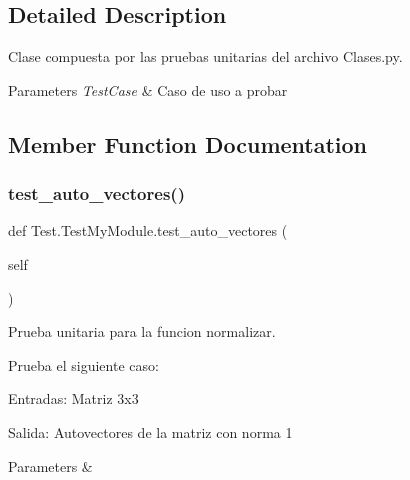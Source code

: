\subsection{Detailed Description}
Clase compuesta por las pruebas unitarias del archivo Clases.\+py. 


\begin{DoxyParams}{Parameters}
{\em Test\+Case} & Caso de uso a probar \\
\hline
\end{DoxyParams}


\subsection{Member Function Documentation}
\mbox{\label{class_test_1_1_test_my_module_a410b576b5600f79f13570c7076bf9bf6}} 
\subsubsection{\texorpdfstring{test\+\_\+auto\+\_\+vectores()}{test\_auto\_vectores()}}
{\footnotesize\ttfamily def Test.\+Test\+My\+Module.\+test\+\_\+auto\+\_\+vectores (\begin{DoxyParamCaption}\item[{}]{self }\end{DoxyParamCaption})}



Prueba unitaria para la funcion normalizar. 

Prueba el siguiente caso\+:
\begin{DoxyEnumerate}
\item Entradas\+: Matriz 3x3
\item Salida\+: Autovectores de la matriz con norma 1
\end{DoxyEnumerate}


\begin{DoxyParams}{Parameters}
{\em } & \\
\hline
\end{DoxyParams}
\mbox{\label{class_test_1_1_test_my_module_ac90753e0abdae446a1a75b174502ff2e}} 
